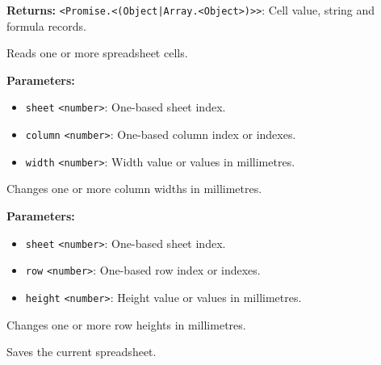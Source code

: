 \documentclass[12pt,a4paper]{article}
\begin{document}
\noindent \textbf{Returns:} \texttt{<Promise.<(Object|Array.<Object>)>>}: Cell value, string and formula records.

\noindent Reads one or more spreadsheet cells.

\vspace{5mm}
\noindent {}


\noindent \textbf{Parameters:}
\begin{itemize}
  \item \texttt{sheet} \texttt{<number>}: One-based sheet index.
  \item \texttt{column} \texttt{<number>}: One-based column index or indexes.
  \item \texttt{width} \texttt{<number>}: Width value or values in millimetres.
\end{itemize}

\noindent Changes one or more column widths in millimetres.

\vspace{5mm}
\noindent {}


\noindent \textbf{Parameters:}
\begin{itemize}
  \item \texttt{sheet} \texttt{<number>}: One-based sheet index.
  \item \texttt{row} \texttt{<number>}: One-based row index or indexes.
  \item \texttt{height} \texttt{<number>}: Height value or values in millimetres.
\end{itemize}

\noindent Changes one or more row heights in millimetres.

\vspace{5mm}
\noindent {}


\noindent Saves the current spreadsheet.

\vspace{5mm}
\noindent {}
\end{document}
